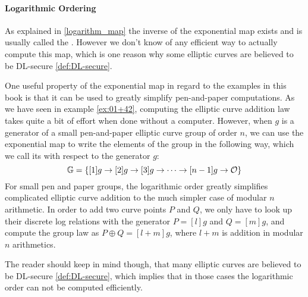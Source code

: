 \paragraph{Logarithmic Ordering}
\label{def:logarithmic_ordering}
As explained in \ref{logarithm_map} the inverse of the exponential map exists and is usually called the . However we don't know of any efficient way to actually compute this map, which is one reason why some elliptic curves are believed to be DL-secure \ref{def:DL-secure}.

One useful property of the exponential map in regard to the examples in this book is that it can be used to greatly simplify pen-and-paper computations. As we have seen in example \ref{ex:01+42}, computing the elliptic curve addition law takes quite a bit of effort when done without a computer. However, when $g$ is a generator of a small pen-and-paper elliptic curve group of order $n$, we can use the exponential map to write the elements of the group in the following way, which we call its  with respect to the generator $g$:
\begin{equation}\label{def:logarithmic_order}
\mathbb{G} = \{[1]g\to [2]g \to [3]g\to\cdots\to [n-1]g\to \mathcal{O}\}
\end{equation} 
For small pen and paper groups, the logarithmic order greatly simplifies complicated elliptic curve addition to the much simpler case of modular $n$ arithmetic. In order to add two curve points $P$ and $Q$, we only have to look up their discrete log relations with the generator $P=[l]g$ and $Q=[m]g$, and compute the group law as $P\oplus Q = [l+m]g$, where $l+m$ is addition in modular $n$ arithmetics. 

The reader should keep in mind though, that many elliptic curves are believed to be DL-secure \ref{def:DL-secure}, which implies that in those cases the logarithmic order can not be computed efficiently.  

